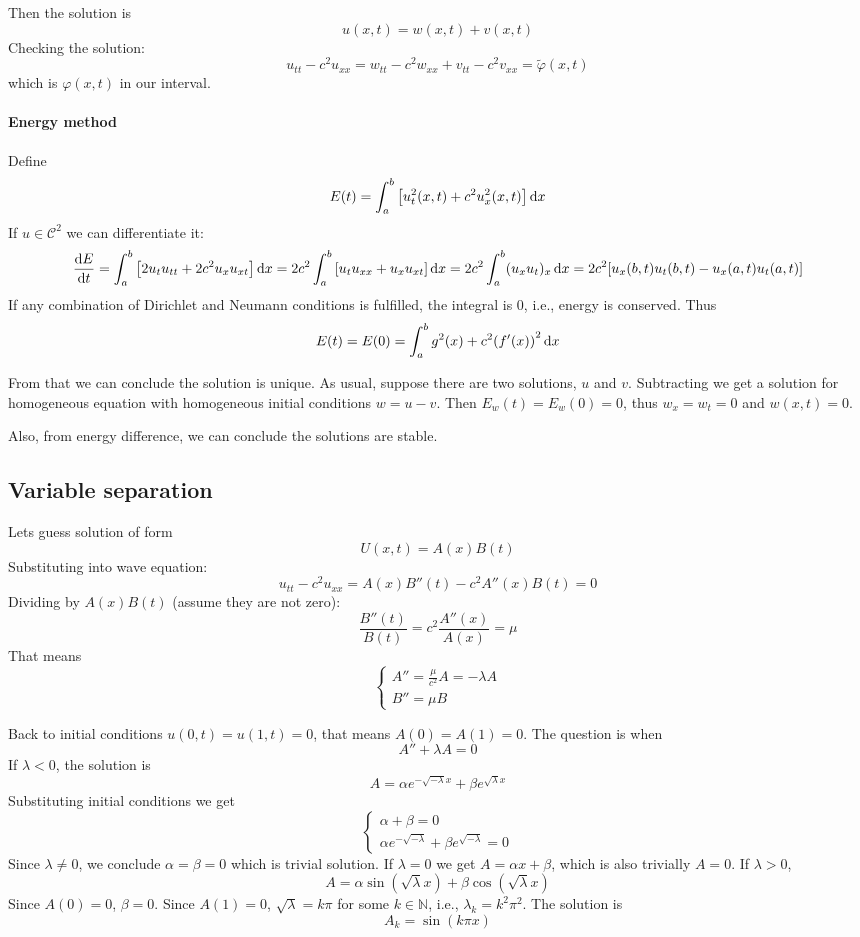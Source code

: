  Then the solution is
 $$u(x,t)= w(x,t)+v(x,t)$$
Checking the solution:
$$u_{tt} - c^2u_{xx}=  w_{tt} - c^2w_{xx} + v_{tt} - c^2v_{xx} = \tilde{\varphi}(x,t)  $$
which is $\varphi(x,t)$ in our interval.
\paragraph{Energy method}
Define
$$E(t) = \int_a^b \qty[ u_t^2(x,t) + c^2u_x^2(x,t)] \dd{x}$$ 
If $u\in \mathcal{C}^2$ we can differentiate it:
$$\dv{E}{t} = \int_a^b \qty[2u_tu_{tt} + 2c^2u_xu_{xt}] \dd{x} = 2c^2\int_a^b \qty[u_t u_{xx} + u_xu_{xt}]\dd{x} = 2c^2 \int_a^b (u_xu_t)_x \dd{x} = 2c^2 \qty[u_x(b,t)u_t(b,t) - u_x(a,t) u_t(a,t)]$$
If any combination of Dirichlet and Neumann conditions is fulfilled, the integral is $0$, i.e., energy is conserved. Thus
$$E(t) = E(0) = \int_a^b g^2(x) + c^2\qty(f'(x))^2 \dd{x}$$

From that we can conclude the solution is unique. As usual, suppose there are two solutions, $u$ and $v$. Subtracting we get a solution for homogeneous equation with homogeneous initial conditions $w=u-v$. Then $E_w(t) = E_w(0)=0$, thus $w_x=w_t=0$ and $w(x,t)=0$.

Also, from energy difference, we can conclude the solutions are stable.
\subsection{Variable separation}
Lets guess solution of form
$$U(x,t) = A(x)B(t)$$
Substituting into wave equation:
$$u_{tt} - c^2u_{xx} = A(x)B''(t) - c^2A''(x) B(t) = 0$$
Dividing by $A(x)B(t)$ (assume they are not zero):
$$\frac{B''(t)}{B(t)} = c^2\frac{A''(x)}{A(x)} = \mu$$
That means
$$\begin{cases}
A'' = \frac{\mu}{c^2}A = -\lambda A \\
B'' = \mu B
\end{cases}$$

Back to initial conditions $u(0,t)=u(1,t)=0$, that means $A(0) =A(1) = 0$. The question is when
$$A''+\lambda A = 0 $$
If $\lambda< 0$, the solution is
$$A = \alpha e^{-\sqrt{-\lambda}x} + \beta e^{\sqrt{\lambda}x}$$
Substituting initial conditions we get
$$\begin{cases}
\alpha+\beta=0\\
\alpha e^{-\sqrt{-\lambda}} + \beta e^{\sqrt{-\lambda}} = 0
\end{cases}$$
Since $\lambda\neq 0$, we conclude $\alpha=\beta=0$ which is trivial solution.
If $\lambda=0$ we get $A=\alpha x+\beta$, which is also trivially $A=0$.
If $\lambda>0$,
$$A = \alpha \sin(\sqrt{\lambda}x)+ \beta\cos(\sqrt{\lambda}x)$$
Since $A(0) = 0$, $\beta=0$. Since $A(1) = 0$, $\sqrt{\lambda} = k\pi$ for some $k \in \mathbb{N}$, i.e., $\lambda_k = k^2\pi^2$. The solution is 
$$A_k = \sin(k\pi x)$$

